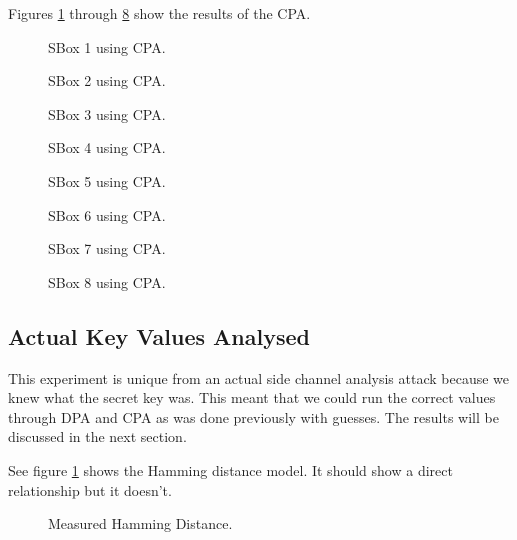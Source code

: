   Figures \ref{fig:cpa1} through \ref{fig:cpa8} show the results of the CPA.
  
  \begin{figure}[h]
  
  \caption{SBox 1 using CPA.}
	\label{fig:cpa1}
  \end{figure}

  \begin{figure}[h]
  
  \caption{SBox 2 using CPA.}
	\label{fig:cpa2}
  \end{figure}

  \begin{figure}[h]
  
  \caption{SBox 3 using CPA.}
	\label{fig:cpa3}
  \end{figure}

  \begin{figure}[h]
  
  \caption{SBox 4 using CPA.}
	\label{fig:cpa4}
  \end{figure}

  \begin{figure}[h]
  
  \caption{SBox 5 using CPA.}
	\label{fig:cpa5}
  \end{figure}

  \begin{figure}[h]
  
  \caption{SBox 6 using CPA.}
	\label{fig:cpa6}
  \end{figure}

  \begin{figure}[h]
  
  \caption{SBox 7 using CPA.}
	\label{fig:cpa7}
  \end{figure}

  \begin{figure}[h]
  
  \caption{SBox 8 using CPA.}
	\label{fig:cpa8}
  \end{figure}

  
\subsection{Actual Key Values Analysed}
  This experiment is unique from an actual side channel analysis attack because we knew what the secret key was.  This meant that we could run the correct values through DPA and CPA as was done previously with guesses.  The results will be discussed in the next section.
  
  See figure \ref{fig:cpa1} shows the Hamming distance model.  It should show a direct relationship but it doesn't.
  
  \begin{figure}[h]
  
  \caption{Measured Hamming Distance.}
	\label{fig:cor}
  \end{figure}
  
